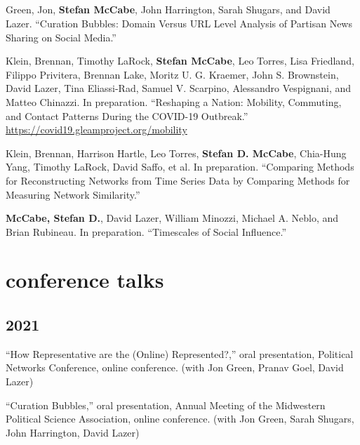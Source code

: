 \documentclass[11pt, letter]{article}
\begin{document}
\subsection*{} %
\vspace{-6mm} %
\begin{hangparas}{.25in}{1}
Green, Jon, \textbf{Stefan McCabe}, John Harrington, Sarah Shugars, and David Lazer.
``Curation Bubbles: Domain Versus URL Level Analysis of Partisan News Sharing
on Social Media.'' \vspace{2mm}

Klein, Brennan,\textsuperscript{\textdagger} Timothy
LaRock,\textsuperscript{\textdagger} \textbf{Stefan
  McCabe},\textsuperscript{\textdagger} Leo Torres,\textsuperscript{\textdagger}
Lisa Friedland, Filippo Privitera, Brennan Lake, Moritz U. G. Kraemer, John S.
Brownstein, David Lazer, Tina Eliassi-Rad, Samuel V. Scarpino, Alessandro
Vespignani, and Matteo Chinazzi. In preparation. ``Reshaping a Nation: Mobility,
Commuting, and Contact Patterns During the COVID-19 Outbreak.''
\href{https://covid19.gleamproject.org/mobility}{https://covid19.gleamproject.org/mobility} \vspace{2mm}

Klein, Brennan, Harrison Hartle, Leo Torres, \textbf{Stefan D. McCabe},
Chia-Hung Yang, Timothy LaRock, David Saffo, et al. In preparation. ``Comparing
Methods for Reconstructing Networks from Time Series Data by Comparing Methods
for Measuring Network Similarity.'' \vspace{2mm}

\textbf{McCabe, Stefan D.}, David Lazer, William Minozzi, Michael A. Neblo, and
Brian Rubineau. In preparation. ``Timescales of Social Influence.'' \vspace{2mm}
\end{hangparas}

\section{conference talks}

\subsection{2021}
\begin{hangparas}{.25in}{1}
  ``How Representative are the (Online) Represented?,'' oral presentation, 
  Political Networks Conference, online conference. (with Jon Green, Pranav
  Goel, David Lazer)

  ``Curation Bubbles,'' oral presentation, Annual Meeting of the Midwestern
  Political Science Association, online conference. (with Jon Green, Sarah
  Shugars, John Harrington, David Lazer)
\end{hangparas}
\end{document}
